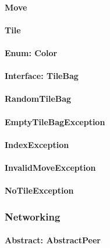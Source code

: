\documentclass[12pt, letterpaper]{article}
\begin{document}
    \paragraph{Move}


    \paragraph{Tile}

    \paragraph{Enum: Color}

    \paragraph{Interface: TileBag}

    \paragraph{RandomTileBag}


    \paragraph{EmptyTileBagException}

    \paragraph{IndexException}

    \paragraph{InvalidMoveException}

    \paragraph{NoTileException}


    \subsubsection{Networking}

    \paragraph{Abstract: AbstractPeer}
\end{document}

